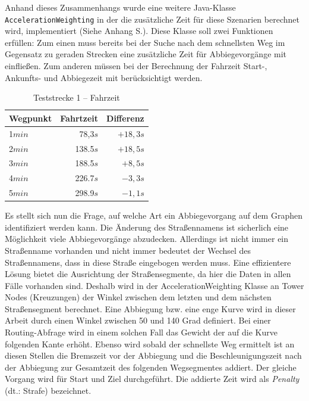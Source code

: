 Anhand dieses Zusammenhangs wurde eine weitere Java-Klasse \texttt{AccelerationWeighting} in der die zusätzliche Zeit für diese Szenarien berechnet wird, implementiert (Siehe Anhang S.\pageref{sec:source}).
Diese Klasse soll zwei Funktionen erfüllen:
Zum einen muss bereits bei der Suche nach dem schnellsten Weg im Gegensatz zu geraden Strecken eine zusätzliche Zeit für Abbiegevorgänge mit einfließen.
Zum anderen müssen bei der Berechnung der Fahrzeit Start-, Ankunfts- und Abbiegezeit mit berücksichtigt werden.

\begin{table}[htb]
\centering
\caption{Teststrecke 1 -- Fahrzeit}
\label{tab:drive11}
\begin{tabular}{|l|r|r|}
\hline
Wegpunkt & Fahrtzeit & Differenz \\ \hline 
1$min$ & 78,3$s$ & $+18,3s$ \\
2$min$ & 138.5$s$ & $+18,5s$ \\
3$min$ & 188.5$s$ & $+8,5s$ \\
4$min$ & 226.7$s$ & $-3,3s$ \\
5$min$ & 298.9$s$ & $-1,1s$ \\
\hline
\end{tabular}
\end{table}

Es stellt sich nun die Frage, auf welche Art ein Abbiegevorgang auf dem Graphen identifiziert werden kann.
Die Änderung des Straßennamens ist sicherlich eine Möglichkeit viele Abbiegevorgänge abzudecken.
Allerdings ist nicht immer ein Straßenname vorhanden und nicht immer bedeutet der Wechsel des Straßennamens, dass in diese Straße eingebogen werden muss.
Eine effizientere Lösung bietet die Ausrichtung der Straßensegmente, da hier die Daten in allen Fälle vorhanden sind.
Deshalb wird in der AccelerationWeighting Klasse an Tower Nodes (Kreuzungen) der Winkel zwischen dem letzten und dem nächsten Straßensegment berechnet.
Eine Abbiegung bzw. eine enge Kurve wird in dieser Arbeit durch einen Winkel zwischen 50 und 140 Grad definiert.
Bei einer Routing-Abfrage wird in einem solchen Fall das Gewicht der auf die Kurve folgenden Kante erhöht.
Ebenso wird sobald der schnellste Weg ermittelt ist an diesen Stellen die Bremszeit vor der Abbiegung und die Beschleunigungszeit nach der Abbiegung zur Gesamtzeit des folgenden Wegsegmentes addiert.
Der gleiche Vorgang wird für Start und Ziel durchgeführt.
Die addierte Zeit wird als \textit{Penalty} (dt.: Strafe) bezeichnet.

